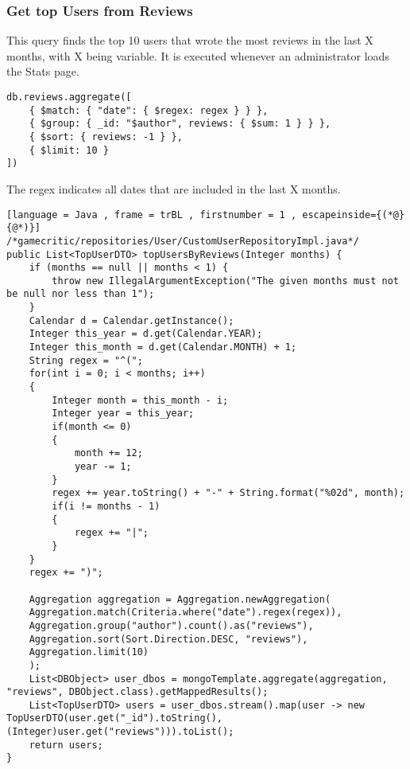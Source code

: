 \subsubsection{Get top Users from Reviews}
This query finds the top 10 users that wrote the most reviews in the last X months, with X being variable. It is executed whenever an administrator loads the Stats page.
\begin{Verbatim}[fontsize=\footnotesize]
db.reviews.aggregate([
    { $match: { "date": { $regex: regex } } },
    { $group: { _id: "$author", reviews: { $sum: 1 } } },
    { $sort: { reviews: -1 } },
    { $limit: 10 }
])
\end{Verbatim}
The regex indicates all dates that are included in the last X months.
\begin{lstlisting}[language = Java , frame = trBL , firstnumber = 1 , escapeinside={(*@}{@*)}]
/*gamecritic/repositories/User/CustomUserRepositoryImpl.java*/
public List<TopUserDTO> topUsersByReviews(Integer months) {
	if (months == null || months < 1) {
		throw new IllegalArgumentException("The given months must not be null nor less than 1");
	}
	Calendar d = Calendar.getInstance();
	Integer this_year = d.get(Calendar.YEAR);
	Integer this_month = d.get(Calendar.MONTH) + 1;
	String regex = "^(";
	for(int i = 0; i < months; i++)
	{
		Integer month = this_month - i;
		Integer year = this_year;
		if(month <= 0)
		{
			month += 12;
			year -= 1;
		}
		regex += year.toString() + "-" + String.format("%02d", month);
		if(i != months - 1)
		{
			regex += "|";
		}
	}
	regex += ")";
	
	Aggregation aggregation = Aggregation.newAggregation(
	Aggregation.match(Criteria.where("date").regex(regex)),
	Aggregation.group("author").count().as("reviews"),
	Aggregation.sort(Sort.Direction.DESC, "reviews"),
	Aggregation.limit(10)
	);
	List<DBObject> user_dbos = mongoTemplate.aggregate(aggregation, "reviews", DBObject.class).getMappedResults();
	List<TopUserDTO> users = user_dbos.stream().map(user -> new TopUserDTO(user.get("_id").toString(), (Integer)user.get("reviews"))).toList();
	return users;
}
\end{lstlisting}

